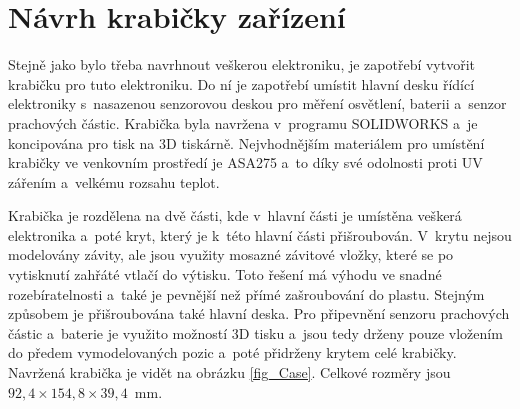 \chapter{Návrh krabičky zařízení}

Stejně jako bylo třeba navrhnout veškerou elektroniku, je zapotřebí vytvořit krabičku pro tuto elektroniku. Do ní je zapotřebí umístit hlavní desku řídící elektroniky s~nasazenou senzorovou deskou pro měření osvětlení, baterii a~senzor prachových částic. Krabička byla navržena v~programu SOLIDWORKS a~je koncipována pro tisk na 3D tiskárně. Nejvhodnějším materiálem pro umístění krabičky ve venkovním prostředí je ASA275 a~to díky své odolnosti proti UV zářením a~velkému rozsahu teplot.

Krabička je rozdělena na dvě části, kde v~hlavní části je umístěna veškerá elektronika a~poté kryt, který je k~této hlavní části přišroubován. V~krytu nejsou modelovány závity, ale jsou využity mosazné závitové vložky, které se po vytisknutí zahřáté vtlačí do výtisku. Toto řešení má výhodu ve snadné rozebíratelnosti a~také je pevnější než přímé zašroubování do plastu. Stejným způsobem je přišroubována také hlavní deska. Pro připevnění senzoru prachových částic a~baterie je využito možností 3D tisku a~jsou tedy drženy pouze vložením do předem vymodelovaných pozic a~poté přidrženy krytem celé krabičky. Navržená krabička je vidět na obrázku \ref{fig_Case}. Celkové rozměry jsou $92,4 \times 154,8 \times 39,4$\SI{}{\milli\metre}.

